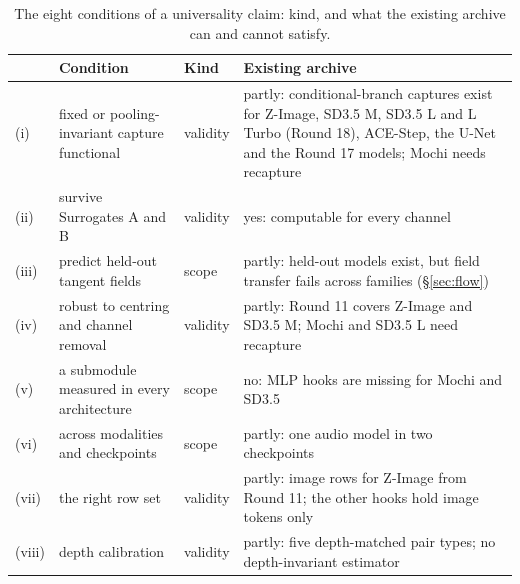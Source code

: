 \documentclass[11pt]{article}
\theoremstyle{definition}
\begin{document}
\begin{table}[htbp]
\centering\small
\caption{The eight conditions of a universality claim: kind, and what the existing archive can and cannot satisfy.}
\label{tab:conditions}
\begin{tabularx}{\linewidth}{@{}lllL@{}}
\toprule
 & Condition & Kind & Existing archive\\
\midrule
(i) & fixed or pooling-invariant capture functional & validity & partly: conditional-branch captures exist for Z-Image, SD3.5 M, SD3.5 L and L Turbo (Round 18), ACE-Step, the U-Net and the Round 17 models; Mochi needs recapture\\
(ii) & survive Surrogates A and B & validity & yes: computable for every channel\\
(iii) & predict held-out tangent fields & scope & partly: held-out models exist, but field transfer fails across families (\S\ref{sec:flow})\\
(iv) & robust to centring and channel removal & validity & partly: Round 11 covers Z-Image and SD3.5 M; Mochi and SD3.5 L need recapture\\
(v) & a submodule measured in every architecture & scope & no: MLP hooks are missing for Mochi and SD3.5\\
(vi) & across modalities and checkpoints & scope & partly: one audio model in two checkpoints\\
(vii) & the right row set & validity & partly: image rows for Z-Image from Round 11; the other hooks hold image tokens only\\
(viii) & depth calibration & validity & partly: five depth-matched pair types; no depth-invariant estimator\\
\bottomrule
\end{tabularx}
\end{table}
\end{document}
